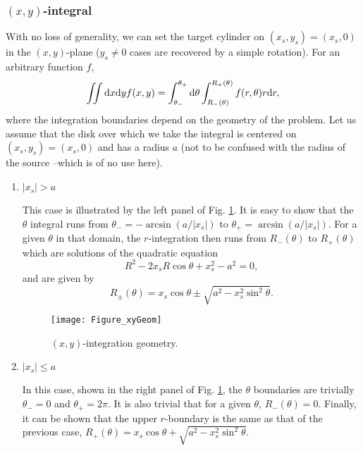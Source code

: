 \documentclass[12pt]{iopart}
\begin{document}
\subsubsection{$(x,y)$-integral}

With no loss of generality, we can set the target cylinder on $(x_s, y_s) = (x_s, 0)$ in the $(x,y)$-plane ($y_s \neq 0$ cases are recovered by a simple rotation).
For an arbitrary function $f$,
\begin{equation}
\iint {\rm d}x {\rm d}y f(x,y) = \int_{\theta_-}^{\theta_+}{\rm d}\theta \int_{R_-(\theta)}^{R_+(\theta)} f(r,\theta) r {\rm d}r,
\end{equation}
where the integration boundaries depend on the geometry of the problem. Let us assume that the disk over which we take the integral is centered on $(x_s, y_s) = (x_s, 0)$ and has a radius $a$ (not to be confused with the radius of the source --which is of no use here).

\begin{enumerate}
\item{$|x_s|>a$}

This case is illustrated by the left panel of Fig. \ref{fig_intxy}. It is easy to show that the $\theta$ integral runs from $\theta_-=-\arcsin(a/|x_s|)$ to $\theta_+=\arcsin(a/|x_s|)$. For a given $\theta$ in that domain, the $r$-integration then runs from $R_-(\theta)$ to $R_+(\theta)$ which are solutions of the quadratic equation
\begin{equation}
R^2 - 2x_s R \cos\theta + x_s^2 - a^2 = 0,
\end{equation}
and are given by
\begin{equation}
R_\pm(\theta) = x_s \cos\theta \pm \sqrt{a^2 - x_s^2 \sin^2\theta}.
\end{equation}

\begin{figure}%
\begin{center}
\texttt{[image: Figure\_xyGeom]}
\caption{$(x,y)$-integration geometry.}
\label{fig_intxy}
\end{center}
\end{figure}


\item{$|x_s| \leqslant a$}

In this case, shown in the right panel of Fig. \ref{fig_intxy}, the $\theta$ boundaries are trivially $\theta_-=0$ and $\theta_+=2\pi$. It is also trivial that for a given $\theta$, $R_-(\theta)=0$. Finally, it can be shown that the upper $r$-boundary is the same as that of the previous case, $R_+(\theta) = x_s \cos\theta + \sqrt{a^2 - x_s^2 \sin^2\theta}$.

\end{enumerate}
\end{document}
